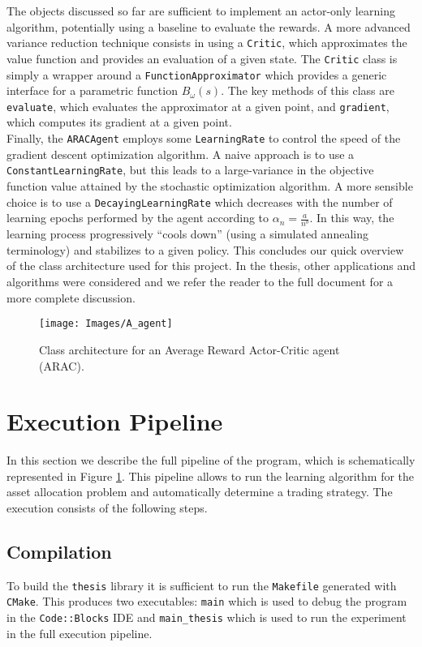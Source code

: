 The objects discussed so far are sufficient to implement an actor-only learning algorithm, potentially using a baseline to evaluate the rewards. A more advanced variance reduction technique consists in using a \lstinline{Critic}, which approximates the value function and provides an evaluation of a given state. The \lstinline{Critic} class is simply a wrapper around a \lstinline{FunctionApproximator} which provides a generic interface for a parametric function $B_\omega(s)$. The key methods of this class are \lstinline{evaluate}, which evaluates the approximator at a given point, and \lstinline{gradient}, which computes its gradient at a given point.\\
Finally, the \lstinline{ARACAgent} employs some \lstinline{LearningRate} to control the speed of the gradient descent optimization algorithm. A naive approach is to use a \lstinline{ConstantLearningRate}, but this leads to a large-variance in the objective function value attained by the stochastic optimization algorithm. A more sensible choice is to use a \lstinline{DecayingLearningRate} which decreases with the number of learning epochs performed by the agent according to $\alpha_n = \frac{a}{n^b}$. In this way, the learning process progressively ``cools down'' (using a simulated annealing terminology) and stabilizes to a given policy. This concludes our quick overview of the class architecture used for this project. In the thesis, other applications and algorithms were considered and we refer the reader to the full document for a more complete discussion.
\begin{sidewaysfigure}[ht]
    \texttt{[image: Images/A\_agent]}
    \caption[Class architecture for an ARAC agent.]{Class architecture for an Average Reward Actor-Critic agent (ARAC).}
    \label{fig:class_architecture_arac}
\end{sidewaysfigure}
\clearpage

\section{Execution Pipeline}
\label{sec:execution_pipeline}

In this section we describe the full pipeline of the program, which is schematically represented in Figure \ref{sec:execution_pipeline}. This pipeline allows to run the learning algorithm for the asset allocation problem and automatically determine a trading strategy. The execution consists of the following steps. 

\subsection{Compilation} To build the \lstinline{thesis} library it is sufficient to run the \lstinline{Makefile} generated with \lstinline{CMake}. This produces two executables: \lstinline{main} which is used to debug the program in the \lstinline{Code::Blocks} IDE and \lstinline{main_thesis} which is used to run the experiment in the full execution pipeline. 

